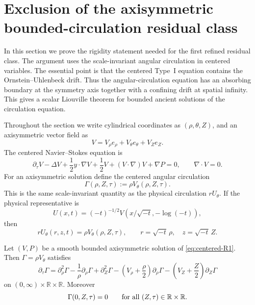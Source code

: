 
\section{Exclusion of the axisymmetric bounded-circulation residual class}
\label{sec:R1-exclusion}

In this section we prove the rigidity statement needed for the first refined
residual class.  The argument uses the scale-invariant angular circulation in
centered variables.  The essential point is that the centered Type~I equation
contains the Ornstein--Uhlenbeck drift.  Thus the angular-circulation equation
has an absorbing boundary at the symmetry axis together with a confining drift
at spatial infinity.  This gives a scalar Liouville theorem for bounded ancient
solutions of the circulation equation.

Throughout the section we write cylindrical coordinates as
\((\rho,\theta,Z)\), and an axisymmetric vector field as
\[
   V=V_\rho e_\rho+V_\theta e_\theta+V_Z e_Z .
\]
The centered Navier--Stokes equation is
\begin{equation}\label{eq:centered-R1}
   \partial_\tau V-\Delta V+\frac12 y\cdot\nabla V+\frac12 V
   +(V\cdot\nabla)V+\nabla P=0,
   \qquad \nabla\cdot V=0 .
\end{equation}
For an axisymmetric solution define the centered angular circulation
\begin{equation}\label{eq:centered-Gamma-def}
   \Gamma(\rho,Z,\tau):=\rho V_\theta(\rho,Z,\tau).
\end{equation}
This is the same scale-invariant quantity as the physical circulation
\(rU_\theta\).  If the physical representative is
\[
   U(x,t)=(-t)^{-1/2}V(x/\sqrt{-t},-\log(-t)),
\]
then
\[
   rU_\theta(r,z,t)=\rho V_\theta(\rho,Z,\tau),
   \qquad r=\sqrt{-t}\,\rho,
   \quad z=\sqrt{-t}\,Z.
\]

\begin{lemma}\label{lem:centered-circulation-equation}
Let \((V,P)\) be a smooth bounded axisymmetric solution of
\eqref{eq:centered-R1}.  Then \(\Gamma=\rho V_\theta\) satisfies
\begin{equation}\label{eq:centered-Gamma-equation}
   \partial_\tau\Gamma
   =
   \partial_\rho^2\Gamma-\frac1\rho\partial_\rho\Gamma
      +\partial_Z^2\Gamma
   -\left(V_\rho+\frac\rho2\right)\partial_\rho\Gamma
   -\left(V_Z+\frac Z2\right)\partial_Z\Gamma
\end{equation}
on \((0,\infty)\times\mathbb R\times\mathbb R\).  Moreover
\begin{equation}\label{eq:axis-boundary-Gamma}
   \Gamma(0,Z,\tau)=0
   \qquad\hbox{for all }(Z,\tau)\in\mathbb R\times\mathbb R .
\end{equation}
\end{lemma}

